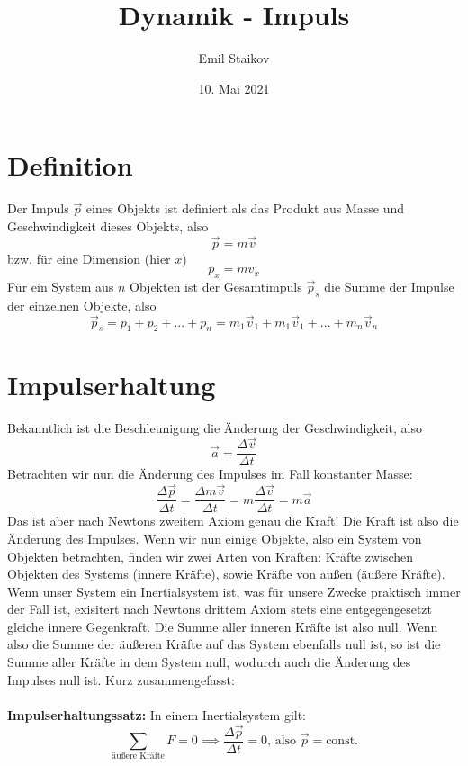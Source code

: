 \documentclass[11pt]{article}
\title{Dynamik - Impuls}
\author{Emil Staikov}
\date{10. Mai 2021}
\begin{document}
\maketitle

\section{Definition}
Der Impuls $\vec{p}$ eines Objekts ist definiert als das Produkt aus Masse und Geschwindigkeit dieses Objekts, also 
\begin{equation*}
    \vec{p} = m\vec{v} 
\end{equation*}
bzw. für eine Dimension (hier $x$) 
\begin{equation*}
    p_x = mv_x
\end{equation*}
Für ein System aus $n$ Objekten ist der Gesamtimpuls $\vec{p}_s$ die Summe der Impulse der einzelnen Objekte, also 
\begin{equation*}
    \vec{p}_s = p_1 + p_2 + ... + p_n = m_1\vec{v}_1 + m_1\vec{v}_1 + ... + m_n\vec{v}_n
\end{equation*}

\section{Impulserhaltung}
Bekanntlich ist die Beschleunigung die Änderung der Geschwindigkeit, also
\begin{equation*}
    \vec{a} = \frac{\Delta \vec{v}}{\Delta t}
\end{equation*}
Betrachten wir nun die Änderung des Impulses im Fall konstanter Masse: 
\begin{equation*}
    \frac{\Delta \vec{p}}{\Delta t} = \frac{\Delta m\vec{v}}{\Delta t} = m \frac{\Delta \vec{v}}{\Delta t} = m\vec{a}
\end{equation*}
Das ist aber nach Newtons zweitem Axiom genau die Kraft! Die Kraft ist also die Änderung des Impulses. Wenn wir nun einige Objekte, also ein System von Objekten betrachten, finden wir zwei Arten von Kräften: Kräfte zwischen Objekten des Systems (innere Kräfte), sowie Kräfte von außen (äußere Kräfte). Wenn unser System ein Inertialsystem ist, was für unsere Zwecke praktisch immer der Fall ist, exisitert nach Newtons drittem Axiom stets eine entgegengesetzt gleiche innere Gegenkraft. Die Summe aller inneren Kräfte ist also null. Wenn also die Summe der äußeren Kräfte auf das System ebenfalls null ist, so ist die Summe aller Kräfte in dem System null, wodurch auch die Änderung des Impulses null ist. Kurz zusammengefasst: \\\\ 
\textbf{Impulserhaltungssatz:} In einem Inertialsystem gilt: 
\begin{equation*}
    \sum_{\text{äußere Kräfte}} F = 0 \implies \frac{\Delta \vec{p}}{\Delta t} = 0 \text{, also } \vec{p} = \text{const.}
\end{equation*}
\end{document}
